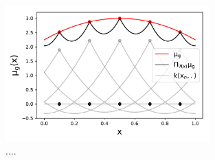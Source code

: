 \documentclass[twoside,11pt]{book}
\numberwithin{theorem}{chapter}
\numberwithin{definition}{chapter}
\numberwithin{proposition}{chapter}
\numberwithin{corollary}{chapter}
\numberwithin{example}{chapter}
\numberwithin{lemma}{chapter}
\numberwithin{assumption}{chapter}
\numberwithin{equation}{chapter}
\numberwithin{figure}{chapter}
\DeclareMathOperator{\Tran}{\intercal}
\begin{document}
\begin{figure}[h]
\centering
\includegraphics[width= 0.7\textwidth]{img/reconstruction/signal_reconstruction_spread_nodes.pdf}
\caption{.... \label{fig:introduction_reconstuction}}
\end{figure}







\end{document}
